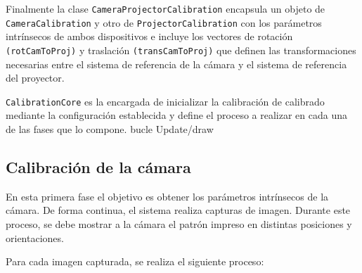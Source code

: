 Finalmente la clase \texttt{CameraProjectorCalibration} encapsula un objeto de  \texttt{CameraCalibration} y otro de \texttt{ProjectorCalibration} con los parámetros intrínsecos de ambos dispositivos e incluye los vectores de rotación \texttt{(rotCamToProj)} y traslación \texttt{(transCamToProj)} que definen las transformaciones necesarias entre el sistema de referencia de la cámara y el sistema de referencia del proyector. 

\texttt{CalibrationCore} es la encargada de inicializar la calibración de calibrado mediante la configuración establecida y define el proceso a realizar en cada una de las fases que lo compone.  bucle Update/draw

  
  
%
%  
  
\subsection{Calibración de la cámara}
En esta primera fase el objetivo es obtener los parámetros intrínsecos de la cámara. De forma continua, el sistema realiza capturas de imagen. Durante este proceso, se debe mostrar a la cámara el patrón impreso en distintas posiciones y orientaciones. 

Para cada imagen capturada, se realiza el siguiente proceso:

